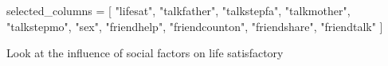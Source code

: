 



selected_columns = [
    "lifesat",
    "talkfather",
    "talkstepfa",
    "talkmother",
    "talkstepmo",
    "sex",
    "friendhelp",
    "friendcounton",
    "friendshare",
    "friendtalk"
]

Look at the influence of social factors on life satisfactory 




